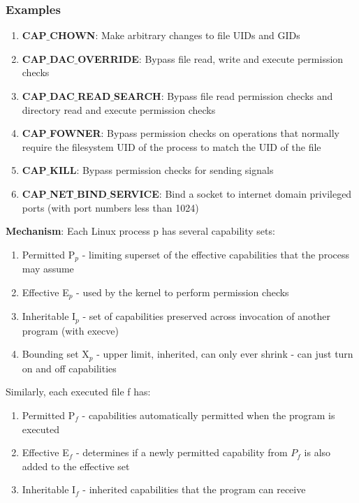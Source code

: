 \documentclass{article}
\begin{document}
\subsubsection{Examples}
\begin{enumerate}
	\item \textbf{CAP$\_$CHOWN}: Make arbitrary changes to file UIDs and GIDs
	\item \textbf{CAP$\_$DAC$\_$OVERRIDE}: Bypass file read, write and execute permission checks
	\item \textbf{CAP$\_$DAC$\_$READ$\_$SEARCH}: Bypass file read permission checks and directory read and execute permission checks
	\item \textbf{CAP$\_$FOWNER}: Bypass permission checks on operations that normally require the filesystem UID of the process to match the UID of the file
	\item \textbf{CAP$\_$KILL}: Bypass permission checks for sending signals
	\item \textbf{CAP$\_$NET$\_$BIND$\_$SERVICE}: Bind a socket to internet domain privileged ports (with port numbers less than 1024)
\end{enumerate}

\textbf{Mechanism}: Each Linux process p has several capability sets:
\begin{enumerate}
	\item Permitted P$_{p}$ - limiting superset of the effective capabilities that the process may assume
	\item Effective E$_{p}$ - used by the kernel to perform permission checks
	\item Inheritable I$_{p}$ - set of capabilities preserved across invocation of another program (with execve)
	\item Bounding set X$_{p}$ - upper limit, inherited, can only ever shrink - can just turn on and off capabilities
\end{enumerate}

Similarly, each executed file f has:
\begin{enumerate}
	\item Permitted P$_{f}$ - capabilities automatically permitted when the program is executed
	\item Effective E$_{f}$ - determines if a newly permitted capability from $P_{f}$ is also added to the effective set
	\item Inheritable I$_{f}$ - inherited capabilities that the program can receive
\end{enumerate} 
\end{document}

